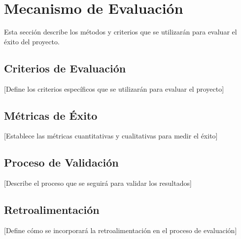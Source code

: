 \section{Mecanismo de Evaluación}

Esta sección describe los métodos y criterios que se utilizarán para evaluar el éxito del proyecto.

\subsection{Criterios de Evaluación}
[Define los criterios específicos que se utilizarán para evaluar el proyecto]

\subsection{Métricas de Éxito}
[Establece las métricas cuantitativas y cualitativas para medir el éxito]

\subsection{Proceso de Validación}
[Describe el proceso que se seguirá para validar los resultados]

\subsection{Retroalimentación}
[Define cómo se incorporará la retroalimentación en el proceso de evaluación]